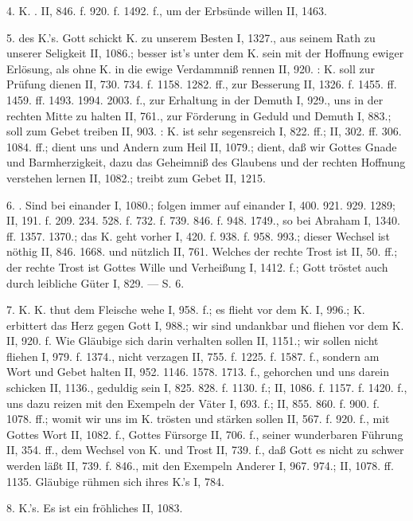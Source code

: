 4. K. . II, 846. f. 920. f. 1492. f., um der Erbsünde willen II, 1463.

5.  des K.’s. Gott schickt K. zu unserem Besten I, 1327., aus seinem Rath zu unserer Seligkeit II, 1086.; besser ist’s unter dem K. sein mit der Hoffnung ewiger Erlösung, als ohne K. in die ewige Verdammniß rennen II, 920. : K. soll zur Prüfung dienen II, 730. 734. f. 1158. 1282. ff., zur Besserung II, 1326. f. 1455. ff. 1459. ff. 1493. 1994. 2003. f., zur Erhaltung in der Demuth I, 929., uns in der rechten Mitte zu halten II, 761., zur Förderung in Geduld und Demuth I, 883.; soll zum Gebet treiben II, 903. : K. ist sehr segensreich I, 822. ff.; II, 302. ff. 306. 1084. ff.; dient uns und Andern zum Heil II, 1079.; dient, daß wir Gottes Gnade und Barmherzigkeit, dazu das Geheimniß des Glaubens und der rechten Hoffnung verstehen lernen II, 1082.; treibt zum Gebet II, 1215.

6. . Sind bei einander I, 1080.; folgen immer auf einander I, 400. 921. 929. 1289; II, 191. f. 209. 234. 528. f. 732. f. 739. 846. f. 948. 1749., so bei Abraham I, 1340. ff. 1357. 1370.; das K. geht vorher I, 420. f. 938. f. 958. 993.; dieser Wechsel ist nöthig II, 846. 1668. und nützlich II, 761. Welches der rechte Trost ist II, 50. ff.; der rechte Trost ist Gottes Wille und Verheißung I, 1412. f.; Gott tröstet auch durch leibliche Güter I, 829. — S.  6.

7.  K. K. thut dem Fleische wehe I, 958. f.; es flieht vor dem K. I, 996.; K. erbittert das Herz gegen Gott I, 988.; wir sind undankbar und fliehen vor dem K. II, 920. f. Wie Gläubige sich darin verhalten sollen II, 1151.; wir sollen nicht fliehen I, 979. f. 1374., nicht verzagen II, 755. f. 1225. f. 1587. f., sondern am Wort und Gebet halten II, 952. 1146. 1578. 1713. f., gehorchen und uns darein schicken II, 1136., geduldig sein I, 825. 828. f. 1130. f.; II, 1086. f. 1157. f. 1420. f., uns dazu reizen mit den Exempeln der Väter I, 693. f.; II, 855. 860. f. 900. f. 1078. ff.; womit wir uns im K. trösten und stärken sollen II, 567. f. 920. f., mit Gottes Wort II, 1082. f., Gottes Fürsorge II, 706. f., seiner wunderbaren Führung II, 354. ff., dem Wechsel von K. und Trost II, 739. f., daß Gott es nicht zu schwer werden läßt II, 739. f. 846., mit den Exempeln Anderer I, 967. 974.; II, 1078. ff. 1135. Gläubige rühmen sich ihres K.’s I, 784.

8.  K.’s. Es ist ein fröhliches II, 1083.

